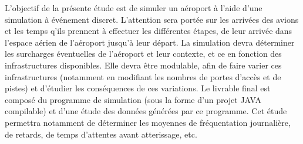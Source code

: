 L’objectif de la présente étude est de simuler un aéroport à l’aide d’une simulation à événement discret. L'attention sera portée sur les arrivées des avions et les temps q'ils prennent à effectuer les différentes étapes, de leur arrivée dans l'espace aérien de l'aéroport jusqu'à leur départ.
La simulation devra déterminer les surcharges éventuelles de l’aéroport et leur contexte, et ce en fonction des infrastructures disponibles. Elle devra être modulable, afin de faire varier ces infrastructures (notamment en modifiant les nombres de portes d’accès et de pistes) et d’étudier les conséquences de ces variations.
Le livrable final est composé du programme de simulation (sous la forme d'un projet JAVA compilable) et d'une étude des données générées par ce programme. Cet étude permettra notamment de déterminer les moyennes de fréquentation journalière, de retards, de temps d'attentes avant atterissage, etc.
